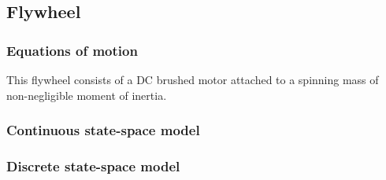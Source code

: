 \subsection{Flywheel}

\subsubsection{Equations of motion}

This flywheel consists of a DC brushed motor attached to a spinning mass of
non-negligible moment of inertia.

\subsubsection{Continuous state-space model}

\subsubsection{Discrete state-space model}
